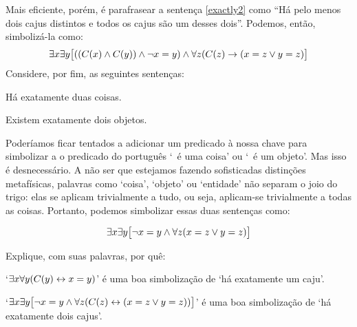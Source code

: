 \normalsize
Mais eficiente, porém, é parafrasear a sentença \ref{exactly2} como
``Há pelo menos dois cajus distintos e todos os cajus são um desses dois''.
Podemos, então, simbolizá-la como:
$$\exists x\exists y\bigl[((\mathord{C}(x) \wedge \mathord{C}(y)) \wedge \neg x = y) \wedge \forall z(\mathord{C}(z) \rightarrow ( x= z \vee y = z)\bigr]$$
Considere, por fim, as seguintes sentenças:
\begin{earg}
\item[\ex{exactly2things}] Há exatamente duas coisas.
\item[\ex{exactly2objects}] Existem exatamente dois objetos.
\end{earg}
Poderíamos ficar tentados a adicionar um predicado à nossa chave para simbolizar a o predicado do português `\blank\ é uma coisa' ou `\blank\ é um objeto'.
Mas isso é desnecessário.
A não ser que estejamos fazendo sofisticadas distinções metafísicas, palavras 
como `coisa', `objeto' ou `entidade' não separam o joio do trigo:
elas se aplicam trivialmente a tudo, ou seja, aplicam-se trivialmente a todas as coisas.
Portanto, podemos simbolizar essas duas sentenças como:

$$\exists x \exists y \bigl[\neg x = y  \wedge \forall z(x=z \vee y = z)\bigr]$$

\practiceproblems

\problempart\label{e:HaExatamenteSee} Explique, com suas palavras, por quê:
	\begin{ebullet}
		\item   `$\exists x \forall y(\mathord{C}(y) \leftrightarrow x= y)$' é uma boa simbolização de `há exatamente um caju'.
		\item `$\exists x \exists y \bigl[\neg x = y \wedge \forall z(\mathord{C}(z) \leftrightarrow (x= z \vee y = z))\bigr]$' é uma boa simbolização de `há exatamente dois cajus'.
	\end{ebullet}		


